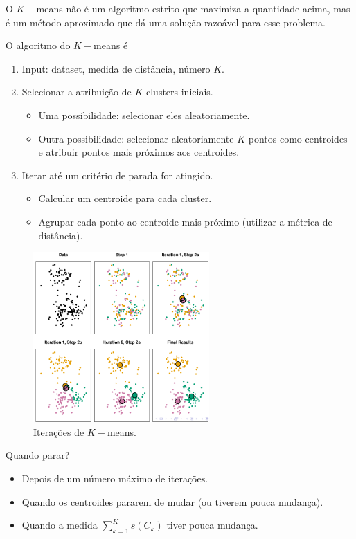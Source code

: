 \documentclass[a4paper,fleqn,12pt]{article}
\begin{document}
O $K-$means não é um algoritmo estrito que maximiza a quantidade acima, mas é um método aproximado que dá uma solução razoável para esse problema.

O algoritmo do $K-$means é
\begin{enumerate}
\item Input: dataset, medida de distância, número $K$.
\item Selecionar a atribuição de $K$ clusters iniciais.
\begin{itemize}
\item Uma possibilidade: selecionar eles aleatoriamente.
\item Outra possibilidade: selecionar aleatoriamente $K$ pontos como centroides e atribuir pontos mais próximos aos centroides.
\end{itemize}
\item Iterar até um critério de parada for atingido.
\begin{itemize}
\item Calcular um centroide para cada cluster.
\item Agrupar cada ponto ao centroide mais próximo (utilizar a métrica de distância).
\end{itemize}
\end{enumerate}
\begin{figure}[H]
\centering
\includegraphics[width=0.6\textwidth]{fig/k-means_it.png}
\caption{Iterações de $K-$means.}
\label{fig:k-means_it}
\end{figure}

Quando parar?
\begin{itemize}
\item Depois de um número máximo de iterações.
\item Quando os centroides pararem de mudar (ou tiverem pouca mudança).
\item Quando a medida $\sum_{k=1}^{K} s(C_k)$ tiver pouca mudança.
\end{itemize}
\end{document}
